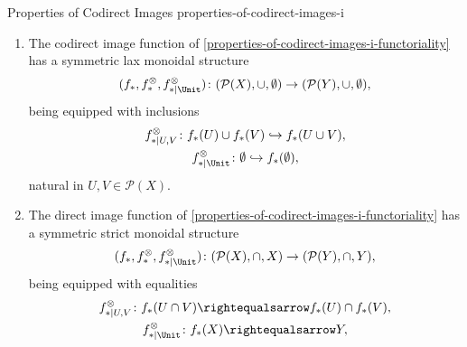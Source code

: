 \begin{proposition}{Properties of Codirect Images \rmI}{properties-of-codirect-images-i}
\begin{enumerate}
            \[
                f_{*}\left(\bigcap_{i\in I}U_{i}\right)%
                =%
                \bigcap_{i\in I}f_{*}(U_{i}),%
            \]%
            natural in $\{U_{i}\}_{i\in I}\in\mathcal{P}(X)^{\times I}$. In particular, we have equalities%
            \[
                \begin{gathered}
                    f^{-1}(U\cap V) = f_{*}(U)\cap f^{-1}(V),\\
                    f_{*}(X)        = Y,
                \end{gathered}
            \]%
            natural in $U,V\in\mathcal{P}(X)$.
        \item\label{properties-of-codirect-images-i-symmetric-lax-monoidality-with-respect-to-unions}The codirect image function of \cref{properties-of-codirect-images-i-functoriality} has a symmetric lax monoidal structure
            \[
                (f_{*},f^{\otimes}_{*},f^{\otimes}_{*|\Unit})
                \colon
                (\mathcal{P}(X),\cup,\emptyset)
                \to
                (\mathcal{P}(Y),\cup,\emptyset),
            \]%
            being equipped with inclusions%
            \[
                \begin{gathered}
                    f^{\otimes}_{*|U,V}   \colon f_{*}(U)\cup f_{*}(V) \hookrightarrow f_{*}(U\cup V),\\
                    f^{\otimes}_{*|\Unit} \colon \emptyset             \hookrightarrow f_{*}(\emptyset),
                \end{gathered}
            \]%
            natural in $U,V\in\mathcal{P}(X)$.
        \item\label{properties-of-codirect-images-i-symmetric-strict-monoidality-with-respect-to-intersections}The direct image function of \cref{properties-of-codirect-images-i-functoriality} has a symmetric strict monoidal structure
            \[
                (f_{*},f^{\otimes}_{*},f^{\otimes}_{*|\Unit})
                \colon
                (\mathcal{P}(X),\cap,X)
                \to
                (\mathcal{P}(Y),\cap,Y),
            \]%
            being equipped with equalities%
            \[
                \begin{gathered}
                    f^{\otimes}_{*|U,V}   \colon f_{*}(U\cap V) \rightequalsarrow f_{*}(U)\cap f_{*}(V),\\
                    f^{\otimes}_{*|\Unit} \colon f_{*}(X)       \rightequalsarrow Y,

\end{gathered}\]
\end{enumerate}
\end{proposition}
